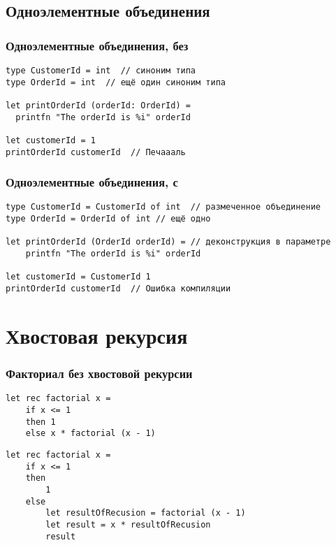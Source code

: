 \documentclass[xetex,mathserif,serif]{beamer}
\begin{document}
    \subsection{Одноэлементные объединения}

    \begin{frame}[fragile]
        \frametitle{Одноэлементные объединения, без}
        \begin{verbatim}
type CustomerId = int  // синоним типа
type OrderId = int  // ещё один синоним типа

let printOrderId (orderId: OrderId) =
  printfn "The orderId is %i" orderId

let customerId = 1  
printOrderId customerId  // Печаааль
        \end{verbatim}
    \end{frame}

    \begin{frame}[fragile]
        \frametitle{Одноэлементные объединения, с}
        \begin{verbatim}
type CustomerId = CustomerId of int  // размеченное объединение 
type OrderId = OrderId of int // ещё одно

let printOrderId (OrderId orderId) = // деконструкция в параметре
    printfn "The orderId is %i" orderId

let customerId = CustomerId 1
printOrderId customerId  // Ошибка компиляции
        \end{verbatim}
    \end{frame}

    \section{Хвостовая рекурсия}

    \begin{frame}[fragile]
        \frametitle{Факториал без хвостовой рекурсии}
        \begin{verbatim}
let rec factorial x =
    if x <= 1
    then 1 
    else x * factorial (x - 1)
        \end{verbatim}

        \begin{verbatim}
let rec factorial x =
    if x <= 1
    then
        1
    else
        let resultOfRecusion = factorial (x - 1)
        let result = x * resultOfRecusion
        result
        \end{verbatim}
    \end{frame}
\end{document}
